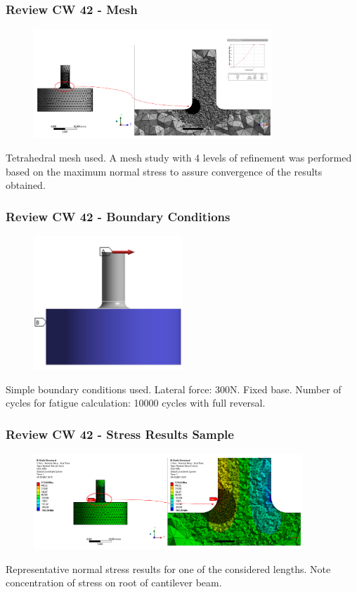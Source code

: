 \begin{frame}
  \frametitle{Review CW 42 - Mesh}
	\begin{figure}
		\includegraphics[width=0.8\textwidth]{pictures/CW42_3}
	\end{figure}
	\centering Tetrahedral mesh used. A mesh study with 4 levels of refinement was performed based on the maximum normal stress to assure convergence of the results obtained.
\end{frame}

\begin{frame}
  \frametitle{Review CW 42 - Boundary Conditions}
	\begin{figure}
		\includegraphics[width=0.5\textwidth]{pictures/CW42_4}
	\end{figure}
	\centering Simple boundary conditions used. Lateral force: 300N. Fixed base. Number of cycles for fatigue calculation: 10000 cycles with full reversal.
\end{frame}

\begin{frame}
  \frametitle{Review CW 42 - Stress Results Sample}
	\begin{figure}
		\includegraphics[width=0.9\textwidth]{pictures/CW42_5}
	\end{figure}
	\centering Representative normal stress results for one of the considered lengths. Note concentration of stress on root of cantilever beam.
\end{frame}

